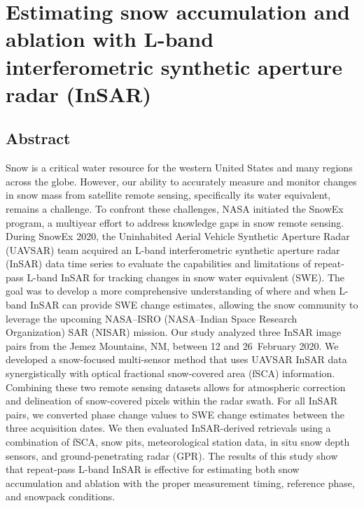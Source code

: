 \hypertarget{ch3}{%
\chapter{Estimating snow accumulation and ablation with L-band interferometric synthetic aperture radar (InSAR)}\label{ch3}}


\hypertarget{ch3-abstract}{\section{Abstract}\label{ch3-abstract}}
Snow is a critical water resource for the western United States and many regions across the globe. However, our ability to accurately measure and monitor changes in snow mass from satellite remote sensing, specifically its water equivalent, remains a challenge. To confront these challenges, NASA initiated the SnowEx program, a multiyear effort to address knowledge gaps in snow remote sensing. During SnowEx 2020, the Uninhabited Aerial Vehicle Synthetic Aperture Radar (UAVSAR) team acquired an L-band interferometric synthetic aperture radar (InSAR) data time series to evaluate the capabilities and limitations of repeat-pass L-band InSAR for tracking changes in snow water equivalent (SWE). The goal was to develop a more comprehensive understanding of where and when L-band InSAR can provide SWE change estimates, allowing the snow community to leverage the upcoming NASA--ISRO (NASA--Indian Space Research Organization) SAR (NISAR) mission. Our study analyzed three InSAR image pairs from the Jemez Mountains, NM, between 12 and 26~February 2020. We developed a snow-focused multi-sensor method that uses UAVSAR InSAR data synergistically with optical fractional snow-covered area (fSCA) information. Combining these two remote sensing datasets allows for atmospheric correction and delineation of snow-covered pixels within the radar swath. For all InSAR pairs, we converted phase change values to SWE change estimates between the three acquisition dates. We then evaluated InSAR-derived retrievals using a combination of fSCA, snow pits, meteorological station data, in situ snow depth sensors, and ground-penetrating radar (GPR). The results of this study show that repeat-pass L-band InSAR is effective for estimating both snow accumulation and ablation with the proper measurement timing, reference phase, and snowpack conditions.

